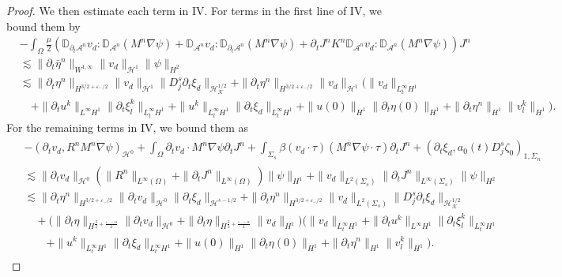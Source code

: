 \documentclass[letterpaper,reqno,10pt,twoside]{amsart}
\theoremstyle{definition}
\theoremstyle{remark}
\def\p{\partial}
\def\Om{\Omega}
\begin{document}
\begin{proof}
		We then estimate each term in IV. For terms in the first line of IV, we bound them by
		\begin{equation}
			\begin{aligned}
				&-\int_\Om\frac{\mu}{2}(\mathbb{D}_{\p_t\mathcal{A}^{n}}v_{d}:\mathbb{D}_{\mathcal{A}^{n}}(M^{n}\nabla\psi)+\mathbb{D}_{\mathcal{A}^{n}}v_{d}:\mathbb{D}_{\p_t\mathcal{A}^{n}}(M^{n}\nabla\psi)+\p_tJ^{n}K^{n}\mathbb{D}_{\mathcal{A}^{n}}v_{d}:\mathbb{D}_{\mathcal{A}^{n}}(M^{n}\nabla\psi))J^{n}\\
				&\lesssim \|\p_t\bar{\eta}^{n}\|_{W^{1,\infty}}\|v_{d}\|_{\mathcal{H}^1}\|\psi\|_{H^2}\\
				&\lesssim\|\p_t\eta^{n}\|_{H^{3/2+\varepsilon_-/2}}\|v_{d}\|_{\mathcal{H}^1}\|D_j^s\p_t\xi_{d}\|_{\mathcal{H}^{1/2}_\mathcal{K}}
				+\|\p_t\eta^{n}\|_{H^{3/2+\varepsilon_-/2}}\|v_{d}\|_{\mathcal{H}^1}\big(\|v_{d}\|_{L_{t}^{\infty}H^{1}}\\
				&\quad+\|\p_{t}u^{k}\|_{L^{\infty}H^{1}}\|\p_{t}\xi_{l}^{k}\|_{L_{t}^{\infty}H^{1}}+\|u^{k}\|_{L_{t}^{\infty}H^{1}}\|\p_{t}\xi_{d}\|_{L_{t}^{\infty}H^{1}}+\|u(0)\|_{H^{1}}\|\p_{t}\eta(0)\|_{H^{1}}+\|\p_{t}\eta^{n}\|_{H^{1}}\|v_{l}^{k}\|_{H^{1}}\big).
			\end{aligned}
		\end{equation}
		For the remaining terms in IV, we bound them as
		\begin{align}
			\begin{aligned}
				&-(\p_tv_{d},R^{n}M^{n}\nabla\psi)_{\mathcal{H}^0}+\int_\Om\p_tv_{d}\cdot M^{n}\nabla\psi\p_tJ^{n}+\int_{\Sigma_s}\beta(v_{d}\cdot\tau)(M^{n}\nabla\psi\cdot\tau)\p_tJ^{n}+(\p_{t}\xi_{d},a_{0}(t)D_{j}^{s}\zeta_{0})_{1,\Sigma_{n}}\\
				&\lesssim\|\p_tv_{d}\|_{\mathcal{H}^0}(\|R^{n}\|_{L^\infty(\Om)}+\|\p_tJ^{n}\|_{L^\infty(\Om)})\|\psi\|_{H^1}+\|v_{d}\|_{L^2(\Sigma_s)}\|\p_tJ^{n}\|_{L^\infty(\Sigma_s)}\|\psi\|_{H^2}\\
				&\lesssim \|\p_t\eta^{n}\|_{H^{3/2+\varepsilon_-/2}}\|\p_tv_{d}\|_{\mathcal{H}^0}\|\p_t\xi_{d}\|_{\mathcal{H}^{s-1/2}}+\|\p_t\eta^{n}\|_{H^{3/2+\varepsilon_-/2}}\|v_{d}\|_{L^2(\Sigma_s)}\|D_j^s\p_t\xi_{d}\|_{\mathcal{H}^{1/2}_\mathcal{K}}\\
				&\quad+\big(\|\p_{t}\eta\|_{H^{\frac{3}{2}+\frac{\varepsilon_{-}-\alpha}{2}}}\|\p_{t}v_{d}\|_{\mathcal{H}^{0}}+\|\p_{t}\eta\|_{H^{\frac{3}{2}+\frac{\varepsilon_{-}-\alpha}{2}}}\|v_{d}\|_{H^{1}}\big)\Big(\|v_{d}\|_{L_{t}^{\infty}H^{1}}+\|\p_{t}u^{k}\|_{L^{\infty}H^{1}}\|\p_{t}\xi_{l}^{k}\|_{L_{t}^{\infty}H^{1}}\\
				&\quad\quad+\|u^{k}\|_{L_{t}^{\infty}H^{1}}\|\p_{t}\xi_{d}\|_{L_{t}^{\infty}H^{1}}+\|u(0)\|_{H^{1}}\|\p_{t}\eta(0)\|_{H^{1}}+\|\p_{t}\eta^{n}\|_{H^{1}}\|v_{l}^{k}\|_{H^{1}}\Big).
			\end{aligned}
		\end{align}
		

\end{proof}
\end{document}
